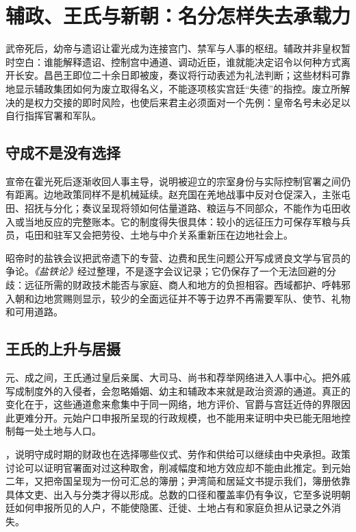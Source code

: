 \section{辅政、王氏与新朝：名分怎样失去承载力}
\label{sec:han-regency-new}

武帝死后，幼帝与遗诏让霍光成为连接宫门、禁军与人事的枢纽。辅政并非皇权暂时空白：谁能解释遗诏、控制宫中通道、调动近臣，谁就能决定诏令以何种方式离开长安。昌邑王即位二十余日即被废，奏议将行动表述为礼法判断；这些材料可靠地显示辅政集团如何为废立取得名义，不能逐项核实宫廷“失德”的指控。废立所解决的是权力交接的即时风险，也使后来君主必须面对一个先例：皇帝名号未必足以自行指挥官署和军队。

\subsection{守成不是没有选择}

宣帝在霍光死后逐渐收回人事主导，说明被迎立的宗室身份与实际控制官署之间仍有距离。边地政策同样不是机械延续。赵充国在羌地战事中反对仓促深入，主张屯田、招抚与分化；奏议呈现将领如何估量道路、粮运与不同部众，不能作为屯田收入或当地反应的完整账本。它的制度得失很具体：较小的远征压力可保存军粮与兵员，屯田和驻军又会把劳役、土地与中介关系重新压在边地社会上。

昭帝时的盐铁会议把武帝遗下的专营、边费和民生问题公开写成贤良文学与官员的争论。\textit{《盐铁论》}经过整理，不是逐字会议记录；它仍保存了一个无法回避的分歧：远征所需的财政技术能否与家庭、商人和地方的负担相容。西域都护、呼韩邪入朝和边地赏赐则显示，较少的全面远征并不等于边界不再需要军队、使节、礼物和可用道路。

\subsection{王氏的上升与居摄}

元、成之间，王氏通过皇后亲属、大司马、尚书和荐举网络进入人事中心。把外戚写成制度外的入侵者，会忽略婚姻、幼主和辅政本来就是政治资源的通道。真正的变化在于，这些通道愈来愈集中于同一网络，地方评价、官爵与宫廷近侍的界限因此更难分开。元始户口申报所呈现的行政规模，也不能用来证明中央已能无阻地控制每一处土地与人口。

，说明守成时期的财政也在选择哪些仪式、劳作和供给可以继续由中央承担。政策讨论可以证明官署面对过这种取舍，削减幅度和地方效应却不能由此推定。到元始二年，又把帝国呈现为一份可汇总的簿册；尹湾简和居延文书提示我们，簿册依靠具体文吏、出入与分类才得以形成。总数的口径和覆盖率仍有争议，它至多说明朝廷如何申报所见的人户，不能使隐匿、迁徙、土地占有和家庭负担从记录之外消失。

